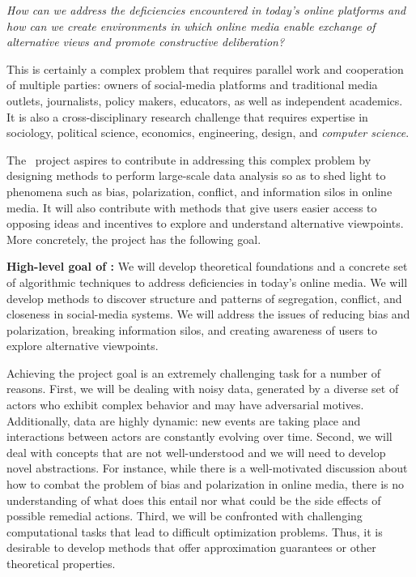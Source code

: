 \documentclass[a4paper,11pt]{article}
\begin{document}
\smallskip
{\em How can we address the deficiencies encountered in today's online platforms  
and how can we create environments in which online media 
enable exchange of alternative views and promote constructive deliberation?}

\smallskip
This is certainly a complex problem that requires
parallel work and cooperation of multiple parties: 
owners of social-media platforms and
traditional media outlets, 
journalists,
policy makers, 
educators, 
as well as independent academics. 
It is also a cross-disciplinary research challenge that requires expertise in 
sociology, political science, economics, engineering, design, and {\em computer science}.

\smallskip
The \acronym\ project aspires to contribute in addressing this complex problem
by designing methods to perform large-scale data analysis so as to shed light to 
phenomena such as bias, polarization, conflict, and 
information silos in online media. 
It will also contribute with methods
that give users easier access to opposing ideas
and incentives to explore and understand alternative view\-points. 
More concretely, the project has the following goal.

\medskip
\noindent
\hspace{-3mm}\colorbox{verylightmagenta}{
\begin{minipage}{\textwidth}
{\bf High-level goal of \acronym:} 
We will develop theoretical foundations and a concrete set of algorithmic techniques 
to address deficiencies in today's online media.
We will develop methods to discover structure and patterns 
of segregation, conflict, and closeness in social-media systems.
We will address the issues of 
reducing bias and po\-lar\-iza\-tion, breaking information silos,
and creating awareness of users to explore alternative view\-points.
\end{minipage}}

Achieving the project goal is an extremely challenging task for a number of reasons. 
First, we will be dealing with noisy data, 
generated by a diverse set of actors
who exhibit complex behavior and may have adversarial motives.
Additionally, data are highly dynamic:
new events are taking place and inter\-actions between actors 
are constantly evolving over time. 
Second, we will deal with concepts that are not well-understood 
and we will need to develop novel abstractions. %
For instance, 
while there is a well-motivated discussion 
about how to combat the problem of bias and polarization in online media, 
there is no understanding of what does this entail %
nor what could be the side effects of possible remedial actions.
Third, we will be confronted with challenging computational tasks 
that lead to difficult optimization problems. 
Thus, it is desirable to develop methods 
that offer approximation guarantees or other theoretical properties. 
\end{document}
